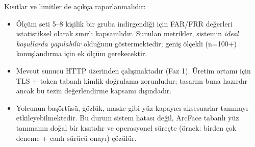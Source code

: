 Kısıtlar ve limitler de açıkça raporlanmalıdır:

\begin{itemize}
    \item Ölçüm seti 5--8 kişilik bir gruba indirgendiği için FAR/FRR
          değerleri istatistiksel olarak sınırlı kapsamlıdır. Sunulan
          metrikler, sistemin \emph{ideal koşullarda yapılabilir} olduğunu
          göstermektedir; geniş ölçekli (n=100+) konuşlandırma için ek
          ölçüm gerekecektir.
    \item Mevcut sunucu HTTP üzerinden çalışmaktadır (Faz 1). Üretim
          ortamı için TLS + token tabanlı kimlik doğrulama zorunludur;
          tasarım buna hazırdır ancak bu tezin değerlendirme kapsamı
          dışındadır.
    \item Yolcunun başörtüsü, gözlük, maske gibi yüz kapayıcı aksesuarlar
          tanımayı etkileyebilmektedir. Bu durum sistem hatası değil,
          ArcFace tabanlı yüz tanımanın doğal bir kısıtıdır ve operasyonel
          süreçte (örnek: birden çok deneme + canlı sürücü onayı) çözülür.
\end{itemize}
